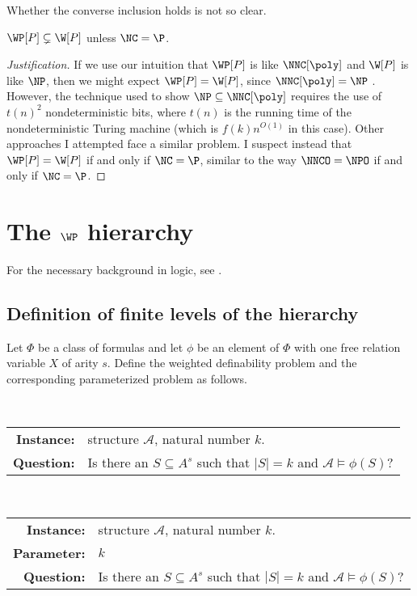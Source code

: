 \documentclass{article}
\newenvironment{justification}{\begin{proof}[Justification]}{\end{proof}}
\begin{document}
Whether the converse inclusion holds is not so clear.

\begin{conjecture}
  $\WP[P] \subsetneq \W[P]$ unless $\NC = \P$.
\end{conjecture}
\begin{justification}
  If we use our intuition that $\WP[P]$ is like $\NNC[\poly]$ and $\W[P]$ is like $\NP$, then we might expect $\WP[P] = \W[P]$, since $\NNC[\poly] = \NP$ \autocite[Theorem~2.2]{wolf94}.
  However, the technique used to show $\NP \subseteq \NNC[\poly]$ requires the use of $t(n)^2$ nondeterministic bits, where $t(n)$ is the running time of the nondeterministic Turing machine (which is $f(k) n^{O(1)}$ in this case).
  Other approaches I attempted face a similar problem.
  I suspect instead that $\WP[P] = \W[P]$ if and only if $\NC = \P$, similar to the way $\NNCO = \NPO$ \autocite{ncapproximation} if and only if $\NC = \P$.
\end{justification}

\section{The \texorpdfstring{$\WP$}{WP} hierarchy}

For the necessary background in logic, see \autocite[Chapter~4]{fg06}.

\subsection{Definition of finite levels of the hierarchy}

Let $\Phi$ be a class of formulas and let $\phi$ be an element of $\Phi$ with one free relation variable $X$ of arity $s$.
Define the weighted definability problem and the corresponding parameterized problem as follows.

\begin{definition}
  \mbox{} \\
  \begin{tabular}{r p{9.2cm}}
    \textbf{Instance:} & structure $\mathcal{A}$, natural number $k$. \\
    \textbf{Question:} & Is there an $S \subseteq A^s$ such that $|S| = k$ and $\mathcal{A} \models \phi(S)$?
  \end{tabular}
\end{definition}

\begin{definition}
  \mbox{} \\
  \begin{tabular}{r p{9.2cm}}
    \textbf{Instance:} & structure $\mathcal{A}$, natural number $k$. \\
    \textbf{Parameter:} & $k$ \\
    \textbf{Question:} & Is there an $S \subseteq A^s$ such that $|S| = k$ and $\mathcal{A} \models \phi(S)$?
  \end{tabular}
\end{definition}
\end{document}
